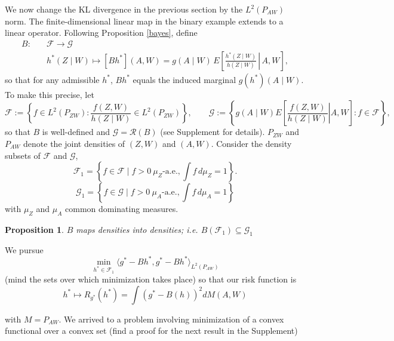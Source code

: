 \documentclass[12pt]{article}
\theoremstyle{thmstyleone}%
\newtheorem{propo}[theo]{Proposition}%
\theoremstyle{thmstyletwo}%
\theoremstyle{thmstylethree}%
\begin{document}
We now change the KL divergence in the previous section by the $L^2(P_{AW})$ norm. The finite-dimensional linear map in the binary example extends to a linear operator. Following Proposition \ref{bayes}, define
\[
\begin{aligned}
	B: \quad & \mathcal{F} \longrightarrow \mathcal{G} \\
	& h^*(Z \mid W) \longmapsto [Bh^*](A, W) 
	= g(A \mid W) \, E \left[ \left. \frac{h^*(Z \mid W)}{h(Z \mid W)} \, \right|\, A, W \right],
\end{aligned}
\]
so that for any admissible $h^*$, $Bh^*$ equals the induced marginal $g(h^*)(A \mid W)$. To make this precise, let
\[ \mathcal{F} := \left\{ f \in L^2(P_{ZW}) : \frac{f(Z,W)}{h(Z \mid W)} \in L^2(P_{ZW}) \right\}, \qquad \mathcal{G} := \left\{ g(A\mid W) E\left[ \left. \frac{f(Z,W)}{h(Z\mid W)} \right| A,W \right] : f \in \mathcal{F} \right\}, \]
so that $B$ is well-defined and $\mathcal{G} = \mathcal{R}(B)$ (see Supplement for details). $P_{ZW}$ and $P_{AW}$ denote the joint densities of $(Z,W)$ and $(A,W)$.
Consider the density subsets of $\mathcal{F}$ and $\mathcal{G}$,
\[
\mathcal{F}_1 = \left\{ f \in \mathcal{F} \mid f > 0 \ \mu_Z\text{-a.e.}, \int f \, d\mu_Z = 1 \right\}.
\]
\[
\mathcal{G}_1 = \left\{ f \in \mathcal{G} \mid f > 0 \ \mu_A\text{-a.e.}, \int f \, d\mu_A = 1 \right\}
\]
with $\mu_Z$ and $\mu_A$ common dominating measures.

\begin{propo}\label{inc} $B$ maps densities into densities; i.e. $B(\mathcal{F}_1) \subseteq \mathcal{G}_1$
\end{propo}


We pursue
$$\min_{h^* \in \mathcal{F}_1} \langle g^* -Bh^*,g^* - Bh^* \rangle_{L^2(P_{AW})}$$
(mind the sets over which minimization takes place) so that our risk function is \begin{equation}\label{sq:risk}
	h^* \mapsto R_{g^*}(h^*) = \int (g^* - B(h))^2 dM(A,W)\end{equation}

with $M=P_{AW}$. We arrived to a problem involving minimization of a convex functional over a convex set (find a proof for the next result in the Supplement)
\end{document}
